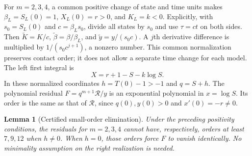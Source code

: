 \documentclass[11pt]{article}
\newtheorem{lemma}[theorem]{Lemma}
\theoremstyle{remark}\newtheorem{remark}[theorem]{Remark}
\begin{document}
For $m=2,3,4$, a common positive change of state and time units makes
$\beta_L=S_L(0)=1$, $X_L(0)=r>0$, and $K_L=k<0$.
Explicitly, with $s_0=S_L(0)$ and $c=\beta_Ls_0$, divide all states
by $s_0$ and use $\tau=ct$ on both sides. Then
$\widetilde K=K/c$, $\widetilde\beta=\beta/\beta_L$, and
$\widetilde y=y/(s_0c)$. A $j$th derivative difference is multiplied by
$1/(s_0c^{j+1})$, a nonzero number. This common normalization preserves
contact order; it does not allow a separate time change for each model.
The left first integral is
\[
 X=r+1-S-k\log S.
\]
In these normalized coordinates $h=T(0)-1>-1$ and $q=S+h$.
The polynomial residual $F=q^{m+1}\mathcal R/y$ is an exponential
polynomial in $x=\log S$. Its order is the same as that of
$\mathcal R$, since $q(0),y(0)>0$ and $x'(0)=-r\ne0$.

\begin{lemma}[Certified small-order elimination]\label{lem:fjelim}
Under the preceding positivity conditions, the residuals for
$m=2,3,4$ cannot have, respectively, orders at least $7,9,12$ when
$h\ne0$. When $h=0$, those orders force $F$ to vanish identically.
No minimality assumption on the right realization is needed.
\end{lemma}
\end{document}
